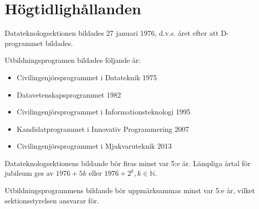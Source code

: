 \documentclass{datateknologsektionen-document}
\begin{document}
\section{Högtidlighållanden}
\label{hogtidshallande}
Datateknologsektionen bildades 27 januari 1976, d.v.s. året efter att D-programmet bildades.

Utbildningsprogramen bildades följande år:
\begin{itemize}
  \item Civilingenjörsprogrammet i Datateknik 1975
  \item Datavetenskapsprogrammet 1982
  \item Civilingenjörsprogrammet i Informationsteknologi 1995
  \item Kandidatprogrammet i Innovativ Programmering 2007
  \item Civilingenjörsprogrammet i Mjukvaruteknik 2013
\end{itemize}

Datateknologsektionens bildande bör firas minst var 5:e år. Lämpliga årtal för jubileum
ges av \(1976 + 5k\) eller \(1976 + 2^k, k \in \mathbb{N}\).

Utbildningsprogrammens bildande bör uppmärksammas minst var 5:e år, vilket sektionsstyrelsen ansvarar för.
\end{document}
